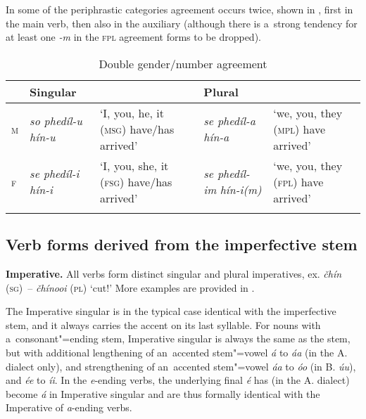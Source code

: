In some of the periphrastic categories agreement occurs twice, shown in , first in the main verb, then also in the auxiliary (although there is a~strong tendency for at least one \textit{-m} in the \textsc{fpl} agreement forms to be dropped).


\begin{table}[ht]
\caption{Double gender/number agreement}

\begin{tabularx}{\textwidth}{ l P{20mm} Q P{20mm} Q }
\lsptoprule
&
Singular &
&
Plural &
\\\hline
\textsc{m} &
\textit{so phedíl-u hín-u} &
`I, you, he, it (\textsc{msg}) have/has arrived' &
\textit{se phedíl-a hín-a} &
`we, you, they (\textsc{mpl}) have arrived'\\
\textsc{f} &
\textit{se phedíl-i hín-i} &
`I, you, she, it (\textsc{fsg}) have/has arrived' &
\textit{se phedíl-im}
\textit{hín-i(m)} &
`we, you, they (\textsc{fpl}) have arrived'\\\lspbottomrule
\end{tabularx}
\label{tab:8-21}
\end{table}


\subsection{Verb forms derived from the imperfective stem}
\label{subsec:8-4-2}


\textbf{Imperative.} All verbs form distinct singular and plural imperatives, ex. \textit{čhín} \textsc{(sg)}~-- \textit{čhínooi} (\textsc{pl}) `cut!' More examples are provided in .



The Imperative singular is in the typical case identical with the imperfective stem, and it always carries the accent on its last syllable. For nouns with a~consonant"=ending stem, Imperative singular is always the same as the stem, but with additional lengthening of an~accented stem"=vowel \textit{á} to \textit{áa} (in the A. dialect only), and strengthening of an~accented stem"=vowel \textit{áa} to \textit{óo} (in B. \textit{úu}), and \textit{ée} to \textit{íi}. In the \textit{e}-ending verbs, the underlying final \textit{é} has (in the A. dialect) become \textit{á} in Imperative singular and are thus formally identical with the Imperative of \textit{a}-ending verbs.


